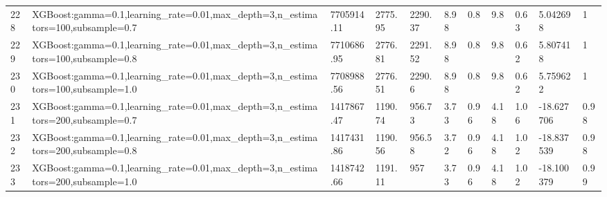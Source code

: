 \begin{longtable}{C{0.8cm} L{2cm} C{1.15cm} C{1.15cm} C{1.15cm} C{1.15cm} C{0.85cm} C{1.25cm} C{1.2cm} C{1.5cm} C{1.0cm}}
228 & XGBoost:\newline gamma=0.1,\newline learning\_rate=0.01,\newline max\_depth=3,\newline n\_estimators=100,\newline subsample=0.7 & 7705914.11 & 2775.95 & 2290.37 & 8.98 & 0.8 & 9.8 & 0.63 & 5.042698 & 1 \\
229 & XGBoost:\newline gamma=0.1,\newline learning\_rate=0.01,\newline max\_depth=3,\newline n\_estimators=100,\newline subsample=0.8 & 7710686.95 & 2776.81 & 2291.52 & 8.98 & 0.8 & 9.8 & 0.62 & 5.807418 & 1 \\
230 & XGBoost:\newline gamma=0.1,\newline learning\_rate=0.01,\newline max\_depth=3,\newline n\_estimators=100,\newline subsample=1.0 & 7708988.56 & 2776.51 & 2290.6 & 8.98 & 0.8 & 9.8 & 0.62 & 5.759622 & 1 \\
231 & XGBoost:\newline gamma=0.1,\newline learning\_rate=0.01,\newline max\_depth=3,\newline n\_estimators=200,\newline subsample=0.7 & 1417867.47 & 1190.74 & 956.73 & 3.73 & 0.96 & 4.18 & 1.06 & -18.627706 & 0.98 \\
232 & XGBoost:\newline gamma=0.1,\newline learning\_rate=0.01,\newline max\_depth=3,\newline n\_estimators=200,\newline subsample=0.8 & 1417431.86 & 1190.56 & 956.58 & 3.72 & 0.96 & 4.18 & 1.02 & -18.837539 & 0.98 \\
233 & XGBoost:\newline gamma=0.1,\newline learning\_rate=0.01,\newline max\_depth=3,\newline n\_estimators=200,\newline subsample=1.0 & 1418742.66 & 1191.11 & 957 & 3.73 & 0.96 & 4.18 & 1.02 & -18.100379 & 0.99 \\

\end{longtable}
